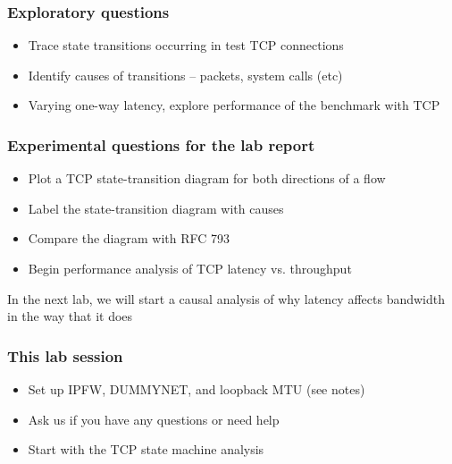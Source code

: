 \begin{frame}
  \frametitle{Exploratory questions}

  \begin{itemize}
    \item Trace state transitions occurring in test TCP connections
    \item Identify causes of transitions -- packets, system calls (etc)
    \item Varying one-way latency, explore performance of the benchmark with
      TCP
  \end{itemize}
\end{frame}

\begin{frame}
  \frametitle{Experimental questions for the lab report}

  \begin{itemize}
    \item Plot a TCP state-transition diagram for both directions of a flow
    \item Label the state-transition diagram with causes
    \item Compare the diagram with RFC 793
    \item Begin performance analysis of TCP latency vs. throughput
  \end{itemize}

  \medskip

  In the next lab, we will start a causal analysis of why latency affects
  bandwidth in the way that it does
\end{frame}

\begin{frame}
  \frametitle{This lab session}

  \begin{itemize}
    \item Set up IPFW, DUMMYNET, and loopback MTU (see notes)
    \item Ask us if you have any questions or need help
    \item Start with the TCP state machine analysis
  \end{itemize}
\end{frame}



